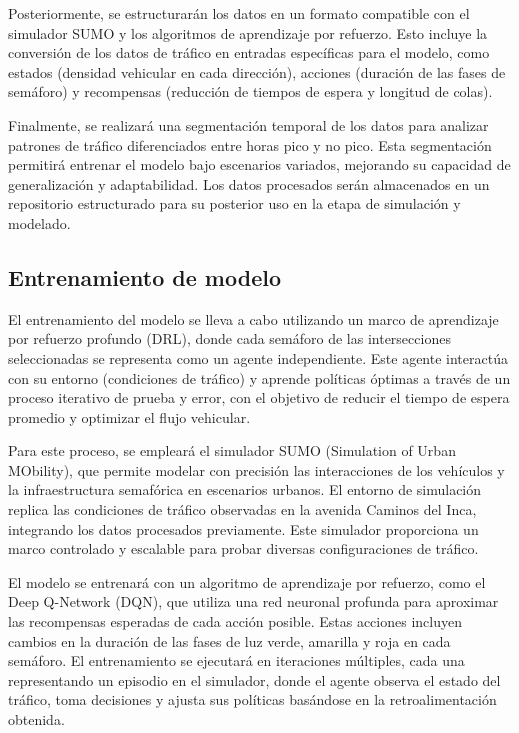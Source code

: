 Posteriormente, se estructurarán los datos en un formato compatible con el simulador SUMO y los algoritmos de aprendizaje por refuerzo. Esto incluye la conversión de los datos de tráfico en entradas específicas para el modelo, como estados (densidad vehicular en cada dirección), acciones (duración de las fases de semáforo) y recompensas (reducción de tiempos de espera y longitud de colas).

Finalmente, se realizará una segmentación temporal de los datos para analizar patrones de tráfico diferenciados entre horas pico y no pico. Esta segmentación permitirá entrenar el modelo bajo escenarios variados, mejorando su capacidad de generalización y adaptabilidad. Los datos procesados serán almacenados en un repositorio estructurado para su posterior uso en la etapa de simulación y modelado.

\subsection{Entrenamiento de modelo}

El entrenamiento del modelo se lleva a cabo utilizando un marco de aprendizaje por refuerzo profundo (DRL), donde cada semáforo de las intersecciones seleccionadas se representa como un agente independiente. Este agente interactúa con su entorno (condiciones de tráfico) y aprende políticas óptimas a través de un proceso iterativo de prueba y error, con el objetivo de reducir el tiempo de espera promedio y optimizar el flujo vehicular.

Para este proceso, se empleará el simulador SUMO (Simulation of Urban MObility), que permite modelar con precisión las interacciones de los vehículos y la infraestructura semafórica en escenarios urbanos. El entorno de simulación replica las condiciones de tráfico observadas en la avenida Caminos del Inca, integrando los datos procesados previamente. Este simulador proporciona un marco controlado y escalable para probar diversas configuraciones de tráfico.

El modelo se entrenará con un algoritmo de aprendizaje por refuerzo, como el Deep Q-Network (DQN), que utiliza una red neuronal profunda para aproximar las recompensas esperadas de cada acción posible. Estas acciones incluyen cambios en la duración de las fases de luz verde, amarilla y roja en cada semáforo. El entrenamiento se ejecutará en iteraciones múltiples, cada una representando un episodio en el simulador, donde el agente observa el estado del tráfico, toma decisiones y ajusta sus políticas basándose en la retroalimentación obtenida.

